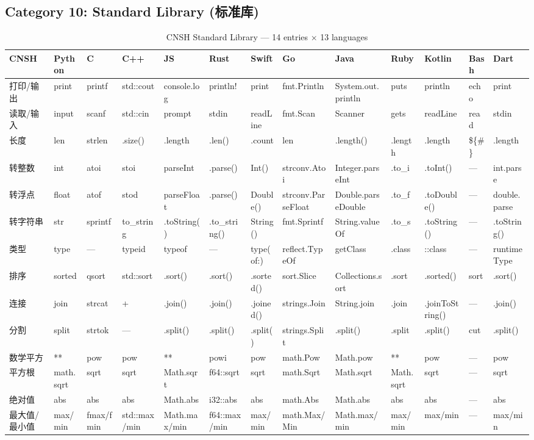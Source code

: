 \subsection{Category 10: Standard Library (标准库)}
\label{app:ren-stdlib}

\begin{table}[h]
\centering
\caption{CNSH Standard Library — 14 entries × 13 languages}
\renewcommand{\arraystretch}{1.2}
\fontsize{8}{10}\selectfont
\begin{tabular}{lllllllllllll}
\toprule
\textbf{CNSH} & \textbf{Python} & \textbf{C} & \textbf{C++} & \textbf{JS} & \textbf{Rust} & \textbf{Swift} & \textbf{Go} & \textbf{Java} & \textbf{Ruby} & \textbf{Kotlin} & \textbf{Bash} & \textbf{Dart} \\
\midrule
打印/输出 & print & printf & std::cout & console.log & println! & print & fmt.Println & System.out.println & puts & println & echo & print \\
读取/输入 & input & scanf & std::cin & prompt & stdin & readLine & fmt.Scan & Scanner & gets & readLine & read & stdin \\
长度 & len & strlen & .size() & .length & .len() & .count & len & .length() & .length & .length & \$\{\#\} & .length \\
转整数 & int & atoi & stoi & parseInt & .parse() & Int() & strconv.Atoi & Integer.parseInt & .to\_i & .toInt() & — & int.parse \\
转浮点 & float & atof & stod & parseFloat & .parse() & Double() & strconv.ParseFloat & Double.parseDouble & .to\_f & .toDouble() & — & double.parse \\
转字符串 & str & sprintf & to\_string & .toString() & .to\_string() & String() & fmt.Sprintf & String.valueOf & .to\_s & .toString() & — & .toString() \\
类型 & type & — & typeid & typeof & — & type(of:) & reflect.TypeOf & getClass & .class & ::class & — & runtimeType \\
排序 & sorted & qsort & std::sort & .sort() & .sort() & .sorted() & sort.Slice & Collections.sort & .sort & .sorted() & sort & .sort() \\
连接 & join & strcat & + & .join() & .join() & .joined() & strings.Join & String.join & .join & .joinToString() & — & .join() \\
分割 & split & strtok & — & .split() & .split() & .split() & strings.Split & .split() & .split & .split() & cut & .split() \\
数学平方 & ** & pow & pow & ** & powi & pow & math.Pow & Math.pow & ** & pow & — & pow \\
平方根 & math.sqrt & sqrt & sqrt & Math.sqrt & f64::sqrt & sqrt & math.Sqrt & Math.sqrt & Math.sqrt & sqrt & — & sqrt \\
绝对值 & abs & abs & abs & Math.abs & i32::abs & abs & math.Abs & Math.abs & abs & abs & — & abs \\
最大值/最小值 & max/min & fmax/fmin & std::max/min & Math.max/min & f64::max/min & max/min & math.Max/Min & Math.max/min & max/min & max/min & — & max/min \\
\bottomrule
\end{tabular}
\end{table}

